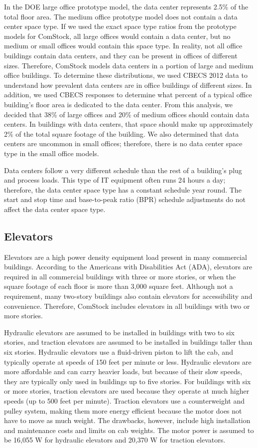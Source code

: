 In the DOE large office prototype model, the data center represents 2.5\% of the total floor area. The medium office prototype model does not contain a data center space type. If we used the exact space type ratios from the prototype models for ComStock, all large offices would contain a data center, but no medium or small offices would contain this space type. In reality, not all office buildings contain data centers, and they can be present in offices of different sizes. Therefore, ComStock models data centers in a portion of large and medium office buildings. To determine these distributions, we used CBECS 2012 data to understand how prevalent data centers are in office buildings of different sizes. In addition, we used CBECS responses to determine what percent of a typical office building's floor area is dedicated to the data center. From this analysis, we decided that 38\% of large offices and 20\% of medium offices should contain data centers. In buildings with data centers, that space should make up approximately 2\% of the total square footage of the building. We also determined that data centers are uncommon in small offices; therefore, there is no data center space type in the small office models. 

Data centers follow a very different schedule than the rest of a building's plug and process loads. This type of IT equipment often runs 24 hours a day; therefore, the data center space type has a constant schedule year round. The start and stop time and base-to-peak ratio (BPR) schedule adjustments do not affect the data center space type. 

\subsection{Elevators}
Elevators are a high power density equipment load present in many commercial buildings. According to the Americans with Disabilities Act (ADA), elevators are required in all commercial buildings with three or more stories, or when the square footage of each floor is more than 3,000 square feet. Although not a requirement, many two-story buildings also contain elevators for accessibility and convenience. Therefore, ComStock includes elevators in all buildings with two or more stories.

Hydraulic elevators are assumed to be installed in buildings with two to six stories, and traction elevators are assumed to be installed in buildings taller than six stories. Hydraulic elevators use a fluid-driven piston to lift the cab, and typically operate at speeds of 150 feet per minute or less. Hydraulic elevators are more affordable and can carry heavier loads, but because of their slow speeds, they are typically only used in buildings up to five stories. For buildings with six or more stories, traction elevators are used because they operate at much higher speeds (up to 500 feet per minute). Traction elevators use a counterweight and pulley system, making them more energy efficient because the motor does not have to move as much weight. The drawbacks, however, include high installation and maintenance costs and limits on cab weights. The motor power is assumed to be 16,055 W for hydraulic elevators and 20,370 W for traction elevators. 

